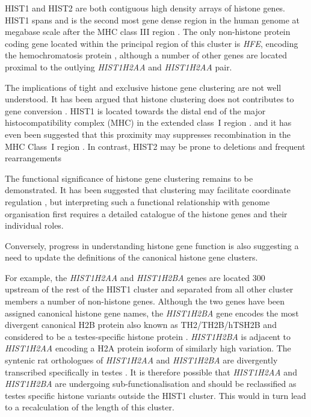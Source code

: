     HIST1 and HIST2 are both contiguous high density arrays of histone genes.
    HIST1 spans 
    and is the second most gene dense region in the human genome at
    megabase scale after the MHC class III region \citep{MHC-III-analysis}.
    The only non-histone protein coding gene located within the principal region of this cluster
    is \textit{HFE}, encoding the hemochromatosis protein \citep{AlbigDoenecke1998},
    although a number of other genes are located
    proximal to the outlying \textit{HIST1H2AA} and \textit{HIST1H2AA} pair.

    The implications of tight and exclusive histone gene clustering are not well understood.
    It has been argued that histone clustering 
    does not contributes to gene conversion \citep{NeiRooney2005}.
    HIST1 is located towards the distal end of the major histocompatibility complex (MHC)
    in the extended class~I region \citep{MHC-I-transcript, MHC-complete-sequencing-1999}.
    and it has even been suggested that this proximity 
    may suppresses recombination in the MHC Class~I region \citep{MHC-repressed-by-HIST}.
    In contrast, HIST2 may be prone to deletions and frequent rearrangements
    \citep{HISTTwo-prone-deletion-discovery, HISTTwo-prone-deletion-focus}

    The functional significance of histone gene clustering remains to be demonstrated.
    It has been suggested that clustering may facilitate coordinate regulation \citep{Eirinlopez2009,close-regulators},
    but interpreting such a functional relationship with genome organisation 
    first requires a detailed catalogue of the histone genes and their individual roles.

    Conversely, progress in understanding histone gene function
    is also suggesting a need to update 
    the definitions of the canonical histone gene clusters.

    For example, the \textit{HIST1H2AA} and \textit{HIST1H2BA} genes 
    are located \SI{300}{\kilo\bp} upstream of the rest of the HIST1 cluster
    and separated from all other cluster members a number of non-histone genes.
    Although the two genes have been assigned canonical histone gene names, 
    the \textit{HIST1H2BA} gene encodes the most divergent canonical H2B protein
    also known as TH2/TH2B/hTSH2B and considered to be 
    a testes-specific histone protein \citep{Zalensky2002,LiAusio2005,Shinagawa2014}.
    \textit{HIST1H2BA} is adjacent to \textit{HIST1H2AA} encoding 
    a H2A protein isoform of similarly high variation.
    The syntenic rat orthologues of \textit{HIST1H2AA} and \textit{HIST1H2BA}
    are divergently transcribed specifically in testes \citep{HuhChae1991}.
    It is therefore possible that \textit{HIST1H2AA} and \textit{HIST1H2BA}
    are undergoing sub-functionalisation and should be reclassified
    as testes specific histone variants outside the HIST1 cluster.
    This would in turn lead to a recalculation of the length of this cluster.

